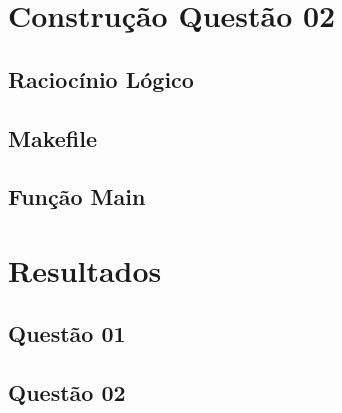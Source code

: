 \documentclass[11pt]{article}
\begin{document}
\section{Constru\c{c}\~ao Quest\~ao 02}
	\subsection{Racioc\'inio L\'ogico}
	\subsection{Makefile}
	\subsection{Fun\c{c}\~ao Main}
\section{Resultados}
	\subsection{Quest\~ao 01}
	\subsection{Quest\~ao 02}
\end{document}

